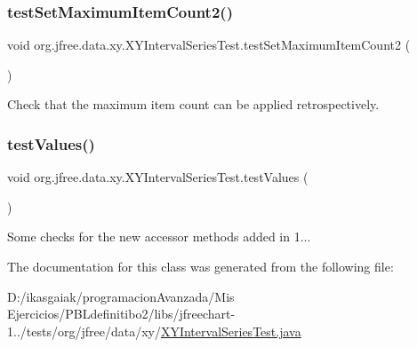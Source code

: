 \subsubsection{\texorpdfstring{test\+Set\+Maximum\+Item\+Count2()}{testSetMaximumItemCount2()}}
{\footnotesize\ttfamily void org.\+jfree.\+data.\+xy.\+X\+Y\+Interval\+Series\+Test.\+test\+Set\+Maximum\+Item\+Count2 (\begin{DoxyParamCaption}{ }\end{DoxyParamCaption})}

Check that the maximum item count can be applied retrospectively. \mbox{\label{classorg_1_1jfree_1_1data_1_1xy_1_1_x_y_interval_series_test_a45d941bba6ea7a460466fd7fe191e347}} 
\subsubsection{\texorpdfstring{test\+Values()}{testValues()}}
{\footnotesize\ttfamily void org.\+jfree.\+data.\+xy.\+X\+Y\+Interval\+Series\+Test.\+test\+Values (\begin{DoxyParamCaption}{ }\end{DoxyParamCaption})}

Some checks for the new accessor methods added in 1... 

The documentation for this class was generated from the following file\+:\begin{DoxyCompactItemize}
\item 
D\+:/ikasgaiak/programacion\+Avanzada/\+Mis Ejercicios/\+P\+B\+Ldefinitibo2/libs/jfreechart-\/1../tests/org/jfree/data/xy/\mbox{\hyperlink{_x_y_interval_series_test_8java}{X\+Y\+Interval\+Series\+Test.\+java}}\end{DoxyCompactItemize}
